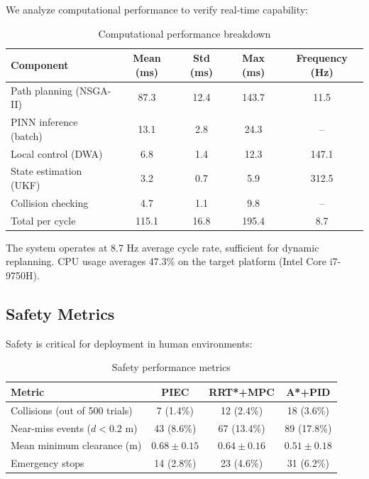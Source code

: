We analyze computational performance to verify real-time capability:

\begin{table}[htbp]
\centering
\caption{Computational performance breakdown}
\label{tab:computational_performance}
\begin{tabular}{lcccc}
\toprule
\textbf{Component} & \textbf{Mean (ms)} & \textbf{Std (ms)} & \textbf{Max (ms)} & \textbf{Frequency (Hz)} \\
\midrule
Path planning (NSGA-II) & 87.3 & 12.4 & 143.7 & 11.5 \\
PINN inference (batch) & 13.1 & 2.8 & 24.3 & -- \\
Local control (DWA) & 6.8 & 1.4 & 12.3 & 147.1 \\
State estimation (UKF) & 3.2 & 0.7 & 5.9 & 312.5 \\
Collision checking & 4.7 & 1.1 & 9.8 & -- \\
\midrule
Total per cycle & 115.1 & 16.8 & 195.4 & 8.7 \\
\bottomrule
\end{tabular}
\end{table}

The system operates at 8.7 Hz average cycle rate, sufficient for dynamic replanning. CPU usage averages 47.3\% on the target platform (Intel Core i7-9750H).


\subsection{Safety Metrics}

Safety is critical for deployment in human environments:

\begin{table}[htbp]
\centering
\caption{Safety performance metrics}
\label{tab:safety_metrics}
\begin{tabular}{lccc}
\toprule
\textbf{Metric} & \textbf{PIEC} & \textbf{RRT*+MPC} & \textbf{A*+PID} \\
\midrule
Collisions (out of 500 trials) & 7 (1.4\%) & 12 (2.4\%) & 18 (3.6\%) \\
Near-miss events ($d < 0.2$ m) & 43 (8.6\%) & 67 (13.4\%) & 89 (17.8\%) \\
Mean minimum clearance (m) & $0.68 \pm 0.15$ & $0.64 \pm 0.16$ & $0.51 \pm 0.18$ \\
Emergency stops & 14 (2.8\%) & 23 (4.6\%) & 31 (6.2\%) \\
\bottomrule
\end{tabular}
\end{table}

